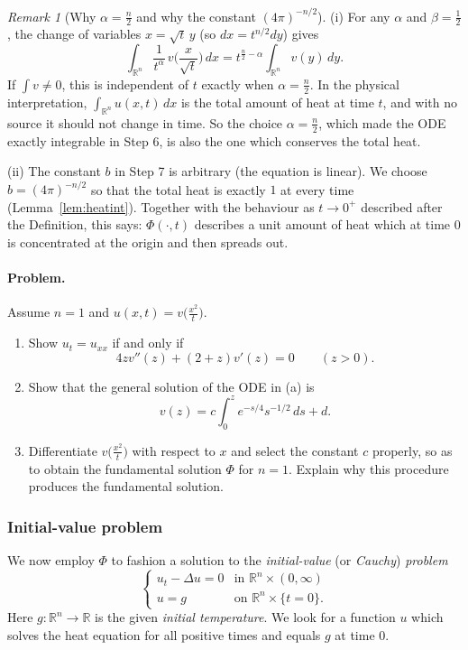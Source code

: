 \documentclass[11pt]{article}
\theoremstyle{plain}
\theoremstyle{definition}
\theoremstyle{remark}
\newtheorem{remark}[theorem]{Remark}
\begin{document}
\begin{remark}[Why $\alpha = \frac n2$ and why the constant $(4\pi)^{-n/2}$]
(i) For any $\alpha$ and $\beta = \frac12$, the change of variables $x = \sqrt t\, y$ (so $dx = t^{n/2}dy$) gives
$$ \int_{\mathbb{R}^n}\frac{1}{t^\alpha}\, v\Big(\frac{x}{\sqrt t}\Big)\, dx = t^{\frac n2 - \alpha}\int_{\mathbb{R}^n} v(y)\, dy. $$
If $\int v \ne 0$, this is independent of $t$ exactly when $\alpha = \frac n2$. In the physical interpretation, $\int_{\mathbb{R}^n} u(x,t)\,dx$ is the total amount of heat at time $t$, and with no source it should not change in time. So the choice $\alpha = \frac n2$, which made the ODE exactly integrable in Step 6, is also the one which conserves the total heat.

(ii) The constant $b$ in Step 7 is arbitrary (the equation is linear). We choose $b = (4\pi)^{-n/2}$ so that the total heat is exactly $1$ at every time (Lemma~\ref{lem:heatint}). Together with the behaviour as $t \to 0^+$ described after the Definition, this says: $\Phi(\cdot,t)$ describes a unit amount of heat which at time $0$ is concentrated at the origin and then spreads out.
\end{remark}

\paragraph{Problem.} Assume $n = 1$ and $u(x,t) = v\big(\frac{x^2}{t}\big)$.
\begin{enumerate}
    \item[(a)] Show $u_t = u_{xx}$ if and only if
    $$ 4zv''(z) + (2 + z)v'(z) = 0 \qquad (z > 0). $$
    \item[(b)] Show that the general solution of the ODE in (a) is
    $$ v(z) = c\int_0^z e^{-s/4}s^{-1/2}\, ds + d. $$
    \item[(c)] Differentiate $v\big(\frac{x^2}{t}\big)$ with respect to $x$ and select the constant $c$ properly, so as to obtain the fundamental solution $\Phi$ for $n = 1$. Explain why this procedure produces the fundamental solution.
\end{enumerate}

\subsubsection{Initial-value problem}\label{sssec:ivp}

We now employ $\Phi$ to fashion a solution to the \emph{initial-value} (or \emph{Cauchy}) \emph{problem}
\begin{equation}\label{eq:ivp}
\begin{cases} u_t - \Delta u = 0 & \text{in } \mathbb{R}^n \times (0,\infty) \\ u = g & \text{on } \mathbb{R}^n \times \{t = 0\}. \end{cases}
\end{equation}
Here $g : \mathbb{R}^n \to \mathbb{R}$ is the given \emph{initial temperature}. We look for a function $u$ which solves the heat equation for all positive times and equals $g$ at time $0$.
\end{document}
